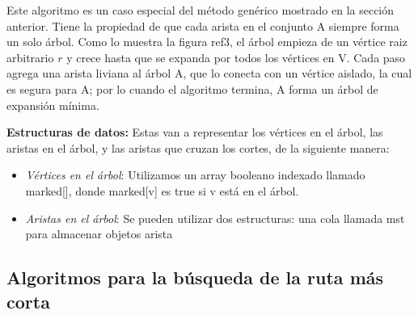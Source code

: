 \documentclass[a4paper, 11pt]{report}
\begin{document}
Este algoritmo es un caso especial del método genérico mostrado en la sección anterior. Tiene la propiedad de que cada arista en el conjunto A siempre forma un solo árbol. Como lo muestra la figura ref3, el árbol empieza de un vértice raiz arbitrario $r$ y crece hasta que se expanda por todos los vértices en V. Cada paso agrega una arista liviana al árbol A, que lo conecta con un vértice aislado, la cual es segura para A; por lo cuando el algoritmo termina, A forma un árbol de expansión mínima. 

\textbf{Estructuras de datos:} Estas van a representar los vértices en el árbol, las aristas en el árbol, y las aristas que cruzan los cortes, de la siguiente manera:
\begin{itemize}
\item \textit{Vértices en el árbol}: Utilizamos un array booleano indexado llamado marked[], donde marked[v] es true si v está en el árbol.
\item \textit{Aristas en el árbol}: Se pueden utilizar dos estructuras: una cola llamada mst para almacenar objetos arista
\end{itemize}



\newpage
\subsection{Algoritmos para la b\'usqueda de la ruta m\'as corta}
\end{document}
